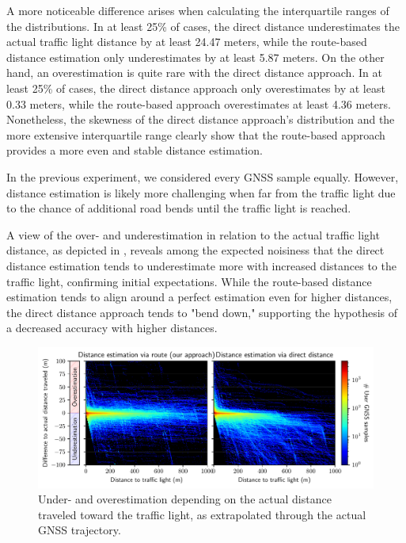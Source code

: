 A more noticeable difference arises when calculating the interquartile ranges of the distributions. In at least 25\% of cases, the direct distance underestimates the actual traffic light distance by at least 24.47 meters, while the route-based distance estimation only underestimates by at least 5.87 meters. On the other hand, an overestimation is quite rare with the direct distance approach. In at least 25\% of cases, the direct distance approach only overestimates by at least 0.33 meters, while the route-based approach overestimates at least 4.36 meters. Nonetheless, the skewness of the direct distance approach's distribution and the more extensive interquartile range clearly show that the route-based approach provides a more even and stable distance estimation.

In the previous experiment, we considered every GNSS sample equally. However, distance estimation is likely more challenging when far from the traffic light due to the chance of additional road bends until the traffic light is reached. 

A view of the over- and underestimation in relation to the actual traffic light distance, as depicted in , reveals among the expected noisiness that the direct distance estimation tends to underestimate more with increased distances to the traffic light, confirming initial expectations. While the route-based distance estimation tends to align around a perfect estimation even for higher distances, the direct distance approach tends to "bend down," supporting the hypothesis of a decreased accuracy with higher distances. 

\begin{figure}[t]
\centering 
\includegraphics[width=\linewidth]{images/routing-distance-scatter.pdf}
\caption{Under- and overestimation depending on the actual distance traveled toward the traffic light, as extrapolated through the actual GNSS trajectory.}
\label{fig:routing-distance-scatter}
\end{figure}


